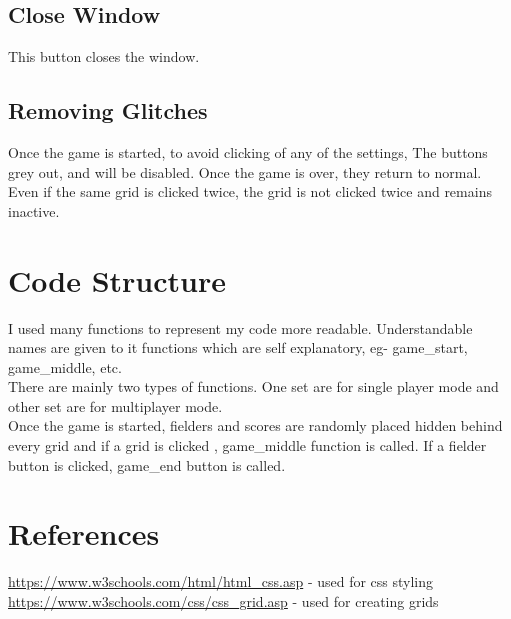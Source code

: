 \documentclass{article}
\begin{document}
\subsection{Close Window}
This button closes the window.
\subsection{Removing Glitches}
Once the game is started, to avoid clicking of any of the settings, The buttons grey out, and will be disabled. Once the game is over, they return to normal.
Even if the same grid is clicked twice, the grid is not clicked twice and remains inactive.

\section{Code Structure}

I used many functions to represent my code more readable. Understandable names are given to it functions which are self explanatory, eg- game\_start, game\_middle, etc.\\
There are mainly two types of functions. One set are for single player mode and other set are for multiplayer mode.\\
Once the game is started, fielders and scores are randomly placed hidden behind every grid and if a grid is clicked , game\_middle function is called. If a fielder button is clicked, game\_end button is called.

\section{References}

\url{https://www.w3schools.com/html/html_css.asp} - used for css styling\\
\url{https://www.w3schools.com/css/css_grid.asp} - used for creating grids
\end{document}
